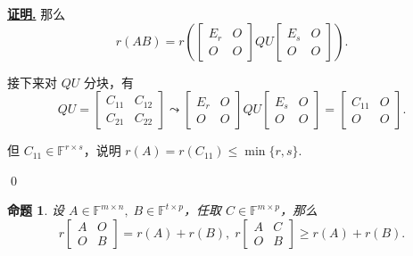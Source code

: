 \documentclass[10pt,openany]{article}
\theoremstyle{thmstyle} %
\theoremstyle{defstyle} %
\theoremstyle{prostyle} %
\newtheorem{proposition}[theorem]{命题}
\theoremstyle{exastyle}
\theoremstyle{remstyle}
\renewenvironment{proof}[1][证明]{\par\underline{\textbf{#1.}} \;\fangsong}{\qed\par}
\newcommand{\F}{\mathbb{F}}
\newcommand{\mn}{^{m \times n}}
\begin{document}
\begin{proof}
	那么
	\[
	r(AB) = r \left(
	\begin{bmatrix}
		E_r & O \\
		O   & O
	\end{bmatrix}
	QU
	\begin{bmatrix}
		E_s & O \\
		O   & O
	\end{bmatrix}
	\right).
	\]
	
	接下来对 \( QU \) 分块，有
	\[
	QU =
	\begin{bmatrix}
		C_{11} & C_{12} \\
		C_{21} & C_{22}
	\end{bmatrix}
	\leadsto
	\begin{bmatrix}
		E_r & O \\
		O   & O
	\end{bmatrix}
	QU
	\begin{bmatrix}
		E_s & O \\
		O   & O
	\end{bmatrix}
	=
	\begin{bmatrix}
		C_{11} & O \\
		O & O
	\end{bmatrix}.
	\]
	
	但 \( C_{11} \in \F^{r \times s} \)，说明 \( r(A)=r(C_{11}) \leq \min\{r,s\} \).
	
\end{proof}

\begin{proposition} \label{3.1.14}
	设 \( A \in \F\mn, \; B \in \F^{t \times p} \)，任取 \( C \in \F^{m \times p}\)，那么
	\[ r \begin{bmatrix}
		A & O \\ O & B
	\end{bmatrix}=r(A)+r(B), \; r \begin{bmatrix}
	A & C \\ O & B
	\end{bmatrix} \geq r(A)+r(B). \]
\end{proposition}
\end{document}
